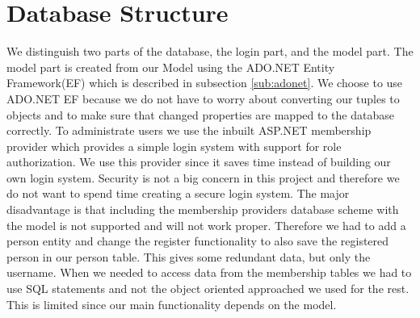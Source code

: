 \section{Database Structure}
\label{sec:databasestructure}

We distinguish two parts of the database, the login part, and the model part. 
The model part is created from our Model  using the ADO.NET Entity Framework(EF) which is described in subsection \ref{sub:adonet}. 
We choose to use ADO.NET EF because we do not have to worry about converting our tuples to objects and to make sure that changed properties are mapped to the database correctly.  
To administrate users we use the inbuilt ASP.NET membership provider which provides a simple login system with support for role authorization. 
We use this provider since it saves time instead of building our own login system. 
Security is not a big concern in this project and therefore we do not want to spend time creating a secure login system. 
The major disadvantage is that including the membership providers database scheme with the model is not supported and will not work proper. 
Therefore we had to add a person entity and change the register functionality to also save the registered person in our person table. 
This gives some redundant data, but only the username. 
When we needed to access data from the membership tables we had to use SQL statements and not the object oriented approached we used for the rest. This is limited since our main functionality depends on the model. 




